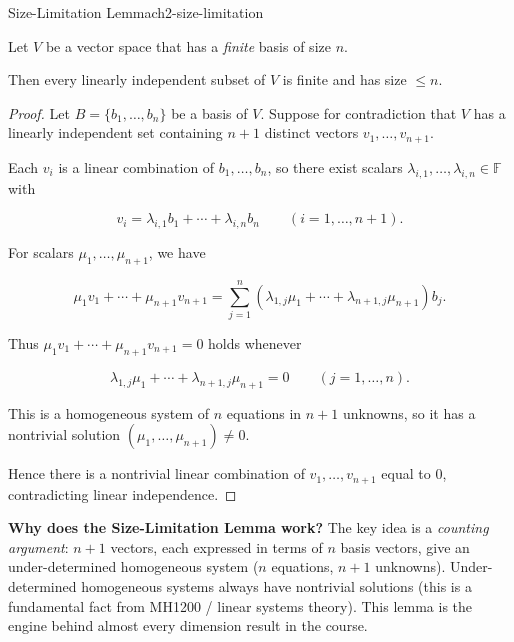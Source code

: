 
\begin{theorem}{Size-Limitation Lemma}{ch2-size-limitation}

Let $V$ be a vector space that has a \emph{finite} basis of size $n$.

Then every linearly independent subset of $V$ is finite and has size $\le n$.

\begin{proof}

Let $B=\{b_1,\ldots,b_n\}$ be a basis of $V$. Suppose for contradiction that $V$ has a linearly independent set containing $n+1$ distinct vectors $v_1,\ldots,v_{n+1}$.

Each $v_i$ is a linear combination of $b_1,\ldots,b_n$, so there exist scalars $\lambda_{i,1},\ldots,\lambda_{i,n}\in\mathbb{F}$ with

\[
v_i=\lambda_{i,1}b_1+\cdots+\lambda_{i,n}b_n \qquad (i=1,\ldots,n+1).
\]

For scalars $\mu_1,\ldots,\mu_{n+1}$, we have

\[
\mu_1v_1+\cdots+\mu_{n+1}v_{n+1}
=
\sum_{j=1}^{n}\left(\lambda_{1,j}\mu_1+\cdots+\lambda_{n+1,j}\mu_{n+1}\right)b_j.
\]

Thus $\mu_1v_1+\cdots+\mu_{n+1}v_{n+1}=0$ holds whenever

\[
\lambda_{1,j}\mu_1+\cdots+\lambda_{n+1,j}\mu_{n+1}=0 \qquad (j=1,\ldots,n).
\]

This is a homogeneous system of $n$ equations in $n+1$ unknowns, so it has a nontrivial solution $(\mu_1,\ldots,\mu_{n+1})\neq 0$.

Hence there is a nontrivial linear combination of $v_1,\ldots,v_{n+1}$ equal to $0$, contradicting linear independence.

\end{proof}

\end{theorem}

\begin{policynote}
\textbf{Why does the Size-Limitation Lemma work?}
The key idea is a \emph{counting argument}: $n+1$ vectors, each expressed in terms of $n$ basis vectors, give an under-determined homogeneous system ($n$ equations, $n+1$ unknowns).
Under-determined homogeneous systems always have nontrivial solutions (this is a fundamental fact from MH1200 / linear systems theory).
This lemma is the engine behind almost every dimension result in the course.
\end{policynote}

